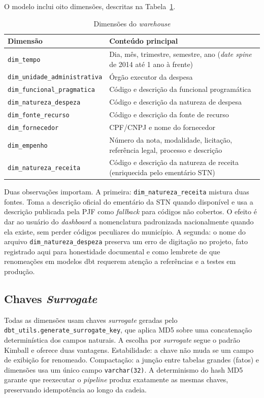 O modelo inclui oito dimensões, descritas na Tabela~\ref{tab:dimensoes}.

\begin{table}[htb]
\caption{Dimensões do \textit{warehouse}}
\label{tab:dimensoes}
\centering
\small
\begin{tabular}{p{4.5cm} p{8.5cm}}
\hline
\textbf{Dimensão} & \textbf{Conteúdo principal} \\
\hline
\texttt{dim\_tempo} & Dia, mês, trimestre, semestre, ano (\textit{date spine} de 2014 até 1 ano à frente) \\
\texttt{dim\_unidade\_administrativa} & Órgão executor da despesa \\
\texttt{dim\_funcional\_pragmatica} & Código e descrição da funcional programática \\
\texttt{dim\_natureza\_despeza} & Código e descrição da natureza de despesa \\
\texttt{dim\_fonte\_recurso} & Código e descrição da fonte de recurso \\
\texttt{dim\_fornecedor} & CPF/CNPJ e nome do fornecedor \\
\texttt{dim\_empenho} & Número da nota, modalidade, licitação, referência legal, processo e descrição \\
\texttt{dim\_natureza\_receita} & Código e descrição da natureza de receita (enriquecida pelo ementário STN) \\
\hline
\end{tabular}
\end{table}

Duas observações importam. A primeira: \texttt{dim\_natureza\_receita} mistura duas fontes. Toma a descrição oficial do ementário da STN quando disponível e usa a descrição publicada pela PJF como \textit{fallback} para códigos não cobertos. O efeito é dar ao usuário do \textit{dashboard} a nomenclatura padronizada nacionalmente quando ela existe, sem perder códigos peculiares do município. A segunda: o nome do arquivo \texttt{dim\_natureza\_despeza} preserva um erro de digitação no projeto, fato registrado aqui para honestidade documental e como lembrete de que renomeações em modelos dbt requerem atenção a referências e a testes em produção.

\subsection{Chaves \textit{Surrogate}}

Todas as dimensões usam chaves \textit{surrogate} geradas pelo \texttt{dbt\_utils.generate\_surrogate\_key}, que aplica MD5 sobre uma concatenação determinística dos campos naturais. A escolha por \textit{surrogate} segue o padrão Kimball e oferece duas vantagens. Estabilidade: a chave não muda se um campo de exibição for renomeado. Compactação: a junção entre tabelas grandes (fatos) e dimensões usa um único campo \texttt{varchar(32)}. A determinismo do hash MD5 garante que reexecutar o \textit{pipeline} produz exatamente as mesmas chaves, preservando idempotência ao longo da cadeia.

